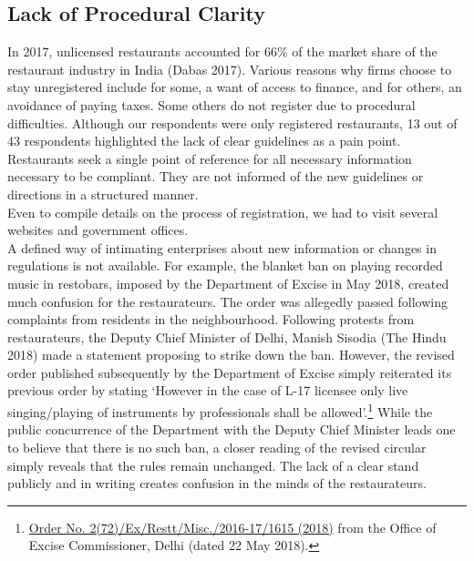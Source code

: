 \documentclass[a4paper, 12pt]{article}
\begin{document}
		\subsection {Lack of Procedural Clarity}
		In 2017, unlicensed restaurants accounted for 66\% of the market share of the restaurant industry in India (Dabas 2017). Various reasons why firms choose to stay unregistered include for some, a want of access to finance, and for others, an avoidance of paying taxes. Some others do not register due to procedural difficulties. Although our respondents were only registered restaurants, 13 out of 43 respondents highlighted the lack of clear guidelines as a pain point. Restaurants seek a single point of reference for all necessary information necessary to be compliant. They are not informed of the new guidelines or directions in a structured manner. \\
		Even to compile details on the process of registration, we had to visit several websites and government offices.\\
		A defined way of intimating enterprises about new information or changes in regulations is not available. For example, the blanket ban on playing recorded music in restobars, imposed by the Department of Excise in May 2018, created much confusion for the restaurateurs. The order was allegedly passed following complaints from residents in the neighbourhood. Following protests from restaurateurs, the Deputy Chief Minister of Delhi, Manish Sisodia (The Hindu 2018) made a statement proposing to strike down the ban. However, the revised order published subsequently by the Department of Excise simply reiterated its previous order by stating ‘However in the case of L-17 licensee only live singing/playing of instruments by professionals shall be allowed’.\footnote{\href{https://bit.ly/2QxMK56}{Order No. 2(72)/Ex/Restt/Misc./2016-17/1615 (2018)} from the Office of Excise Commissioner, Delhi (dated 22 May 2018).}  While the public concurrence of the Department with the Deputy Chief Minister leads one to believe that there is no such ban, a closer reading of the revised circular simply reveals that the rules remain unchanged. The lack of a clear stand publicly and in writing creates confusion in the minds of the restaurateurs.\\
\end{document}
